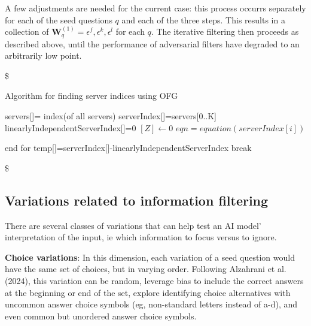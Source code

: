 \documentclass[
]{article}
\theoremstyle{plain}
\theoremstyle{definition}
\theoremstyle{remark}
\begin{document}
A few adjustments are needed for the current case: this process occurrs
separately for each of the seed questions \(q\) and each of the three
steps. This results in a collection of
\(\mathbf{W}_q^{(1)} = \epsilon^f, \epsilon^k, \epsilon^l\) for each
\(q\). The iterative filtering then proceeds as described above, until
the performance of adversarial filters have degraded to an arbitrarily
low point.

\$

\begin{algorithm}
  \caption{Algorithm for finding server indices using OFG}

  \begin{algorithmic}
    \Statex {}
    \State servers[]= index(of all servers) 
    \State serverIndex[]=servers[0..K]
    \State linearlyIndependentServerIndex[]=0
    \State $[Z] \leftarrow 0$
    \Statex{} 
    \State        $eqn= equation(serverIndex[i])$ 
    \Statex{} 

    \EndFor end for 
    \Statex{}  
    \State temp[]=serverIndex[]-linearlyIndependentServerIndex 
    \State break
    \EndIf  
    \EndWhile  
  \end{algorithmic}
\end{algorithm}

\$

\subsection{Variations related to information
filtering}\label{variations-related-to-information-filtering}

There are several classes of variations that can help test an AI model'
interpretation of the input, ie which information to focus versus to
ignore.

\textbf{Choice variations}: In this dimension, each variation of a seed
question would have the same set of choices, but in varying order.
Following Alzahrani et al. (2024), this variation can be random,
leverage bias to include the correct answers at the beginning or end of
the set, explore identifying choice alternatives with uncommon answer
choice symbols (eg, non-standard letters instead of a-d), and even
common but unordered answer choice symbols.
\end{document}
